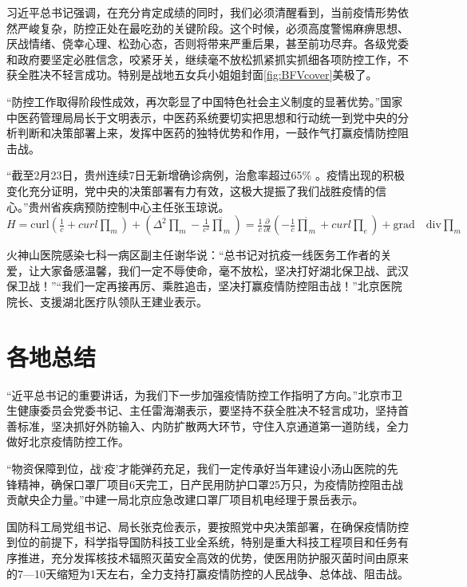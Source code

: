 习近平总书记强调，在充分肯定成绩的同时，我们必须清醒看到，当前疫情形势依然严峻复杂，防控正处在最吃劲的关键阶段。这个时候，必须高度警惕麻痹思想、厌战情绪、侥幸心理、松劲心态，否则将带来严重后果，甚至前功尽弃。各级党委和政府要坚定必胜信念，咬紧牙关，继续毫不放松抓紧抓实抓细各项防控工作，不获全胜决不轻言成功。特别是战地五女兵小姐姐封面\ref{fig:BFVcover}美极了。

“防控工作取得阶段性成效，再次彰显了中国特色社会主义制度的显著优势。”国家中医药管理局局长于文明表示，中医药系统要切实把思想和行动统一到党中央的分析判断和决策部署上来，发挥中医药的独特优势和作用，一鼓作气打赢疫情防控阻击战。

“截至2月23日，贵州连续7日无新增确诊病例，治愈率超过65\% 。疫情出现的积极变化充分证明，党中央的决策部署有力有效，这极大提振了我们战胜疫情的信心。”贵州省疾病预防控制中心主任张玉琼说。
$H=\mathrm{curl}(\frac{1}{c}+curl\prod_m)+(\Delta^2\prod_m-\frac{1}{c^2}\ddot{\prod}_m)=\frac{1}{c}\frac{\partial}{\partial t}(-\frac{1}{c}\dot{\prod}_m+curl\prod_e)+\mathrm{grad}\quad\mathrm{div}\prod_m$

火神山医院感染七科一病区副主任谢华说：“总书记对抗疫一线医务工作者的关爱，让大家备感温馨，我们一定不辱使命，毫不放松，坚决打好湖北保卫战、武汉保卫战！”“我们一定再接再厉、乘胜追击，坚决打赢疫情防控阻击战！”北京医院院长、支援湖北医疗队领队王建业表示。
\section{各地总结}
“近平总书记的重要讲话，为我们下一步加强疫情防控工作指明了方向。”北京市卫生健康委员会党委书记、主任雷海潮表示，要坚持不获全胜决不轻言成功，坚持首善标准，坚决抓好外防输入、内防扩散两大环节，守住入京通道第一道防线，全力做好北京疫情防控工作。

“物资保障到位，战‘疫’才能弹药充足，我们一定传承好当年建设小汤山医院的先锋精神，确保口罩厂项目6天完工，日产民用防护口罩25万只，为疫情防控阻击战贡献央企力量。”中建一局北京应急改建口罩厂项目机电经理于景岳表示。

国防科工局党组书记、局长张克俭表示，要按照党中央决策部署，在确保疫情防控到位的前提下，科学指导国防科技工业全系统，特别是重大科技工程项目和任务有序推进，充分发挥核技术辐照灭菌安全高效的优势，使医用防护服灭菌时间由原来的7—10天缩短为1天左右，全力支持打赢疫情防控的人民战争、总体战、阻击战。